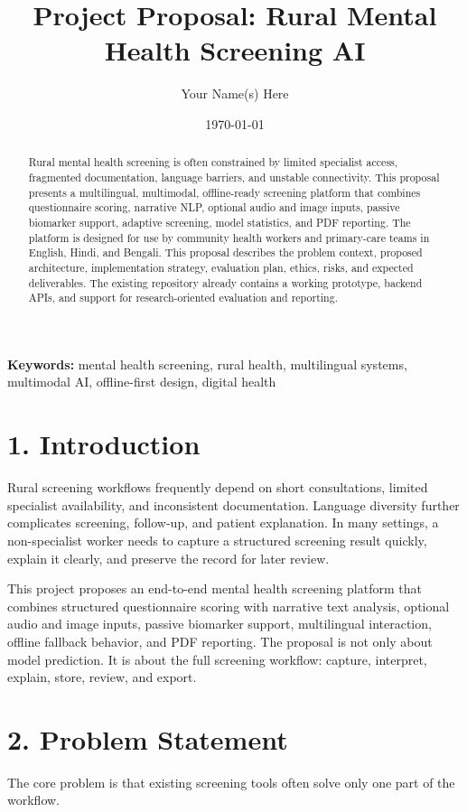 \documentclass[11pt]{article}
\title{Project Proposal: Rural Mental Health Screening AI}
\author{Your Name(s) Here}
\date{\today}
\begin{document}
\maketitle

\begin{abstract}
Rural mental health screening is often constrained by limited specialist access, fragmented documentation, language barriers, and unstable connectivity. This proposal presents a multilingual, multimodal, offline-ready screening platform that combines questionnaire scoring, narrative NLP, optional audio and image inputs, passive biomarker support, adaptive screening, model statistics, and PDF reporting. The platform is designed for use by community health workers and primary-care teams in English, Hindi, and Bengali. This proposal describes the problem context, proposed architecture, implementation strategy, evaluation plan, ethics, risks, and expected deliverables. The existing repository already contains a working prototype, backend APIs, and support for research-oriented evaluation and reporting.
\end{abstract}

\noindent\textbf{Keywords:} mental health screening, rural health, multilingual systems, multimodal AI, offline-first design, digital health

\section{1. Introduction}
Rural screening workflows frequently depend on short consultations, limited specialist availability, and inconsistent documentation. Language diversity further complicates screening, follow-up, and patient explanation. In many settings, a non-specialist worker needs to capture a structured screening result quickly, explain it clearly, and preserve the record for later review.

This project proposes an end-to-end mental health screening platform that combines structured questionnaire scoring with narrative text analysis, optional audio and image inputs, passive biomarker support, multilingual interaction, offline fallback behavior, and PDF reporting. The proposal is not only about model prediction. It is about the full screening workflow: capture, interpret, explain, store, review, and export.

\section{2. Problem Statement}
The core problem is that existing screening tools often solve only one part of the workflow.
\end{document}
